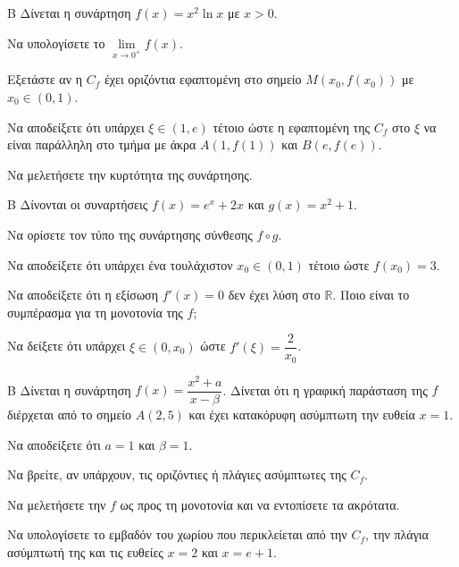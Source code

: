 \begin{thema}{Β}
Δίνεται η συνάρτηση $f(x) = x^2 \ln x$ με $x > 0$.
\begin{erwthma}
\item Να υπολογίσετε το $\lim\limits_{x \to 0^+} f(x)$.
\item Εξετάστε αν η $C_f$ έχει οριζόντια εφαπτομένη στο σημείο $M(x_0,f(x_0))$ με $x_0\in(0,1)$.
\item Να αποδείξετε ότι υπάρχει $\xi \in (1, e)$ τέτοιο ώστε η εφαπτομένη της $C_f$ στο $\xi$ να είναι παράλληλη στο τμήμα με άκρα $A(1, f(1))$ και $B(e, f(e))$.
\item Να μελετήσετε την κυρτότητα της συνάρτησης.
\end{erwthma}
\end{thema}

\begin{thema}{Β}
Δίνονται οι συναρτήσεις $f(x) = e^x + 2x$ και $g(x) = x^2 + 1$.
\begin{erwthma}
\item Να ορίσετε τον τύπο της συνάρτησης σύνθεσης $f \circ g$.
\item Να αποδείξετε ότι υπάρχει ένα τουλάχιστον $x_0 \in (0, 1)$ τέτοιο ώστε $f(x_0) = 3$.
\item Να αποδείξετε ότι η εξίσωση $f'(x) = 0$ δεν έχει λύση στο $\mathbb{R}$. Ποιο είναι το συμπέρασμα για τη μονοτονία της $f$;
\item Να δείξετε ότι υπάρχει $\xi \in (0, x_0)$ ώστε $f'(\xi) = \dfrac{2}{x_0}$.
\end{erwthma}
\end{thema}

\begin{thema}{Β}
Δίνεται η συνάρτηση $f(x) = \dfrac{x^2+a}{x-\beta}$. Δίνεται ότι η γραφική παράσταση της $f$ διέρχεται από το σημείο $A(2, 5)$ και έχει κατακόρυφη ασύμπτωτη την ευθεία $x=1$.
\begin{erwthma}
  \item Να αποδείξετε ότι $a=1$ και $\beta=1$.
  \item Να βρείτε, αν υπάρχουν, τις οριζόντιες ή πλάγιες ασύμπτωτες της $C_f$.
  \item Να μελετήσετε την $f$ ως προς τη μονοτονία και να εντοπίσετε τα ακρότατα.
  \item Να υπολογίσετε το εμβαδόν του χωρίου που περικλείεται από την $C_f$, την πλάγια ασύμπτωτή της και τις ευθείες $x=2$ και $x=e+1$.
\end{erwthma}
\end{thema}


